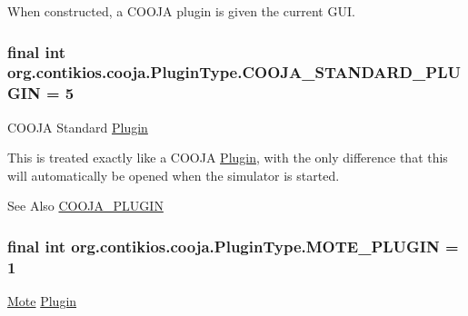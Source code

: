 When constructed, a C\-O\-O\-J\-A plugin is given the current G\-U\-I. \hypertarget{interfaceorg_1_1contikios_1_1cooja_1_1PluginType_a19f9fbc0c23f33b5decbdf6076f7b872}{
\subsubsection[{C\-O\-O\-J\-A\-\_\-\-S\-T\-A\-N\-D\-A\-R\-D\-\_\-\-P\-L\-U\-G\-I\-N}]{\setlength{\rightskip}{0pt plus 5cm}final int org.\-contikios.\-cooja.\-Plugin\-Type.\-C\-O\-O\-J\-A\-\_\-\-S\-T\-A\-N\-D\-A\-R\-D\-\_\-\-P\-L\-U\-G\-I\-N = 5\hspace{0.3cm}{\ttfamily [static]}}}\label{interfaceorg_1_1contikios_1_1cooja_1_1PluginType_a19f9fbc0c23f33b5decbdf6076f7b872}
C\-O\-O\-J\-A Standard \hyperlink{interfaceorg_1_1contikios_1_1cooja_1_1Plugin}{Plugin}

This is treated exactly like a C\-O\-O\-J\-A \hyperlink{interfaceorg_1_1contikios_1_1cooja_1_1Plugin}{Plugin}, with the only difference that this will automatically be opened when the simulator is started.

\begin{DoxySeeAlso}{See Also}
\hyperlink{interfaceorg_1_1contikios_1_1cooja_1_1PluginType_ab27aecee60e220de3c427952226e45f8}{C\-O\-O\-J\-A\-\_\-\-P\-L\-U\-G\-I\-N} 
\end{DoxySeeAlso}
\hypertarget{interfaceorg_1_1contikios_1_1cooja_1_1PluginType_a0feea5aed2c626e527a69fb659439478}{
\subsubsection[{M\-O\-T\-E\-\_\-\-P\-L\-U\-G\-I\-N}]{\setlength{\rightskip}{0pt plus 5cm}final int org.\-contikios.\-cooja.\-Plugin\-Type.\-M\-O\-T\-E\-\_\-\-P\-L\-U\-G\-I\-N = 1\hspace{0.3cm}{\ttfamily [static]}}}\label{interfaceorg_1_1contikios_1_1cooja_1_1PluginType_a0feea5aed2c626e527a69fb659439478}
\hyperlink{interfaceorg_1_1contikios_1_1cooja_1_1Mote}{Mote} \hyperlink{interfaceorg_1_1contikios_1_1cooja_1_1Plugin}{Plugin}

